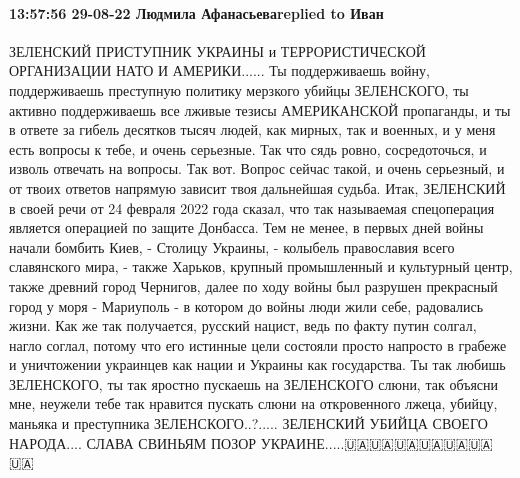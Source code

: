  
 
 
 
 

\paragraph{13:57:56 29-08-22 Людмила Афанасьеваreplied to Иван}

ЗЕЛЕНСКИЙ ПРИСТУПНИК УКРАИНЫ и ТЕРРОРИСТИЧЕСКОЙ ОРГАНИЗАЦИИ НАТО И АМЕРИКИ...... Ты поддерживаешь войну, поддерживаешь преступную
политику мерзкого убийцы ЗЕЛЕНСКОГО, ты активно поддерживаешь все лживые тезисы
АМЕРИКАНСКОЙ пропаганды, и ты в ответе за гибель десятков тысяч людей, как мирных, так и
военных, и у меня есть вопросы к тебе, и очень серьезные. Так что сядь ровно,
сосредоточься, и изволь отвечать на вопросы. Так вот. Вопрос сейчас такой, и
очень серьезный, и от твоих ответов напрямую зависит твоя дальнейшая судьба.
Итак, ЗЕЛЕНСКИЙ в своей речи от 24 февраля 2022 года сказал, что так называемая
спецоперация является операцией по защите Донбасса. Тем не менее, в первых дней
войны начали бомбить Киев, - Столицу Украины, - колыбель православия всего
славянского мира, - также Харьков, крупный промышленный и культурный центр,
также древний город Чернигов, далее по ходу войны был разрушен прекрасный
город у моря - Мариуполь - в котором до войны люди жили себе, радовались
жизни. Как же так получается, русский нацист, ведь по факту путин солгал,
нагло соглал, потому что его истинные цели состояли просто напросто в грабеже и
уничтожении украинцев как нации и Украины как государства. Ты так любишь ЗЕЛЕНСКОГО,
ты так яростно пускаешь на ЗЕЛЕНСКОГО слюни, так объясни мне, неужели тебе так
нравится пускать слюни на откровенного лжеца, убийцу, маньяка и преступника
ЗЕЛЕНСКОГО..?.....
ЗЕЛЕНСКИЙ УБИЙЦА СВОЕГО НАРОДА....
СЛАВА СВИНЬЯМ
ПОЗОР УКРАИНЕ.....🇺🇦🇺🇦🇺🇦🇺🇦🇺🇦🇺🇦🇺🇦
